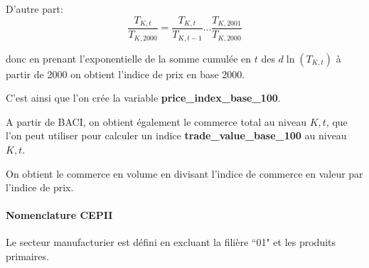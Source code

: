 \documentclass[12pt]{article}
\begin{document}
D'autre part:
$$\frac{T_{K,t}}{T_{K,2000}} = \frac{T_{K,t}}{T_{K,t-1}} \dots \frac{T_{K,2001}}{T_{K,2000}}$$

donc en prenant l'exponentielle de la somme cumulée en $t$ des $d\ln(T_{K,t})$ à partir de 2000 on obtient l'indice de prix en base 2000. 

C'est ainsi que l'on crée la variable \textbf{price\_index\_base\_100}. 

A partir de BACI, on obtient également le commerce total au niveau $K, t$, que l'on peut utiliser pour calculer un indice \textbf{trade\_value\_base\_100} au niveau $K, t$. 

On obtient le commerce en volume en divisant l'indice de commerce en valeur par l'indice de prix. 

\paragraph{Nomenclature CEPII}

Le secteur manufacturier est défini en excluant la filière ``01" et les produits primaires.
\end{document}
